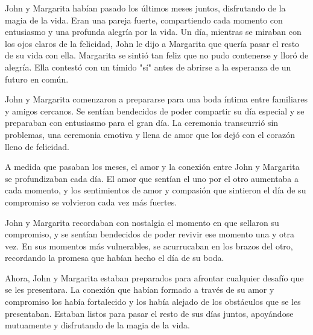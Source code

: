 

John y Margarita habían pasado los últimos meses juntos, disfrutando de la magia de la vida. Eran una pareja fuerte, compartiendo cada momento con entusiasmo y una profunda alegría por la vida. Un día, mientras se miraban con los ojos claros de la felicidad, John le dijo a Margarita que quería pasar el resto de su vida con ella. Margarita se sintió tan feliz que no pudo contenerse y lloró de alegría. Ella contestó con un tímido "sí" antes de abrirse a la esperanza de un futuro en común.

John y Margarita comenzaron a prepararse para una boda íntima entre familiares y amigos cercanos. Se sentían bendecidos de poder compartir su día especial y se preparaban con entusiasmo para el gran día. La ceremonia transcurrió sin problemas, una ceremonia emotiva y llena de amor que los dejó con el corazón lleno de felicidad.

A medida que pasaban los meses, el amor y la conexión entre John y Margarita se profundizaban cada día. El amor que sentían el uno por el otro aumentaba a cada momento, y los sentimientos de amor y compasión que sintieron el día de su compromiso se volvieron cada vez más fuertes.

John y Margarita recordaban con nostalgia el momento en que sellaron su compromiso, y se sentían bendecidos de poder revivir ese momento una y otra vez. En sus momentos más vulnerables, se acurrucaban en los brazos del otro, recordando la promesa que habían hecho el día de su boda.

Ahora, John y Margarita estaban preparados para afrontar cualquier desafío que se les presentara. La conexión que habían formado a través de su amor y compromiso los había fortalecido y los había alejado de los obstáculos que se les presentaban. Estaban listos para pasar el resto de sus días juntos, apoyándose mutuamente y disfrutando de la magia de la vida.
